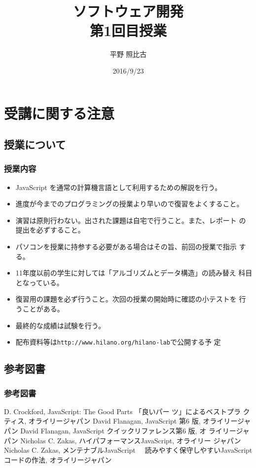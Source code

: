 
\title{ソフトウェア開発\\第1回目授業}
\author{平野 照比古}
\institute{}
\date{2016/9/23}

\frame{\maketitle}
\section{受講に関する注意}
\subsection{授業について}
\begin{frame}
 \frametitle{授業内容}
\begin{itemize}
 \item JavaScript を通常の計算機言語として利用するための解説を行う。
 \item 進度が今までのプログラミングの授業より早いので復習をよくすること。
 \item 演習は原則行わない。出された課題は自宅で行うこと。また、レポート
       の提出を必ずすること。
 \item パソコンを授業に持参する必要がある場合はその旨、前回の授業で指示
       する。
 \item 11年度以前の学生に対しては「アルゴリズムとデータ構造」の読み替え
       科目となっている。
  \item 復習用の課題を必ず行うこと。次回の授業の開始時に確認の小テストを
       行うことがある。
\item 最終的な成績は試験を行う。
 \item 配布資料等は\texttt{http://www.hilano.org/hilano-lab}で公開する予
       定
\end{itemize}
\end{frame}
\subsection{参考図書}
\begin{frame}
 \frametitle{参考図書}
\begin{thebibliography}{9}
 D. Crockford, JavaScript: The Good Parts 「良いパー
	 ツ」によるベストプラ クティス, オライリージャパン
 David Flanagan, JavaScript 第6 版, オライリージャパン
 David Flanagan, JavaScript クイックリファレンス第6 版, オ
	 ライリージャパン
 Nicholas C. Zakas, ハイパフォーマンスJavaScript, オライリー
	 ジャパン
 Nicholas C. Zakas, メンテナブルJavaScript 　読みやすく保守しやすいJavaScript 
コードの作法, オライリージャパン
\end{thebibliography}
\end{frame}
